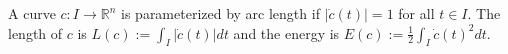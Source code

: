 A curve $c: I \to \mathbb{R}^n$ is parameterized by arc length if $|\dot{c}(t)| = 1$ for all $t \in I$. The length of $c$ is $L(c) := \int_I |\dot{c}(t)| dt$ and the energy is $E(c) := \frac{1}{2} \int_I \dot{c}(t)^2 dt$.